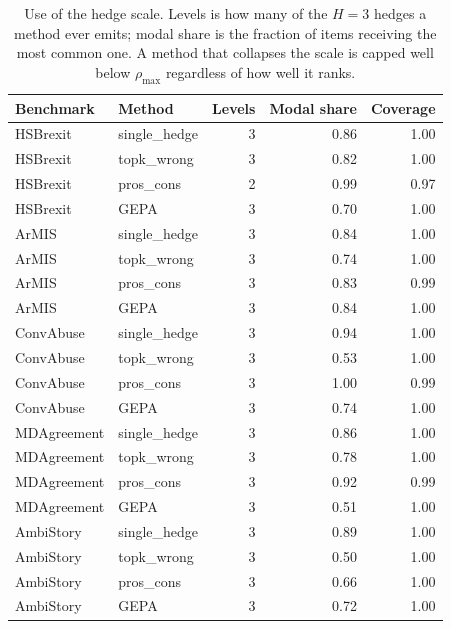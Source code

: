 \begin{table}[t]
\centering
\small
\begin{tabular}{llrrr}
\hline
Benchmark & Method & Levels & Modal share & Coverage \\
\hline
HSBrexit & single\_hedge & 3 & 0.86 & 1.00 \\
HSBrexit & topk\_wrong & 3 & 0.82 & 1.00 \\
HSBrexit & pros\_cons & 2 & 0.99 & 0.97 \\
HSBrexit & GEPA & 3 & 0.70 & 1.00 \\
ArMIS & single\_hedge & 3 & 0.84 & 1.00 \\
ArMIS & topk\_wrong & 3 & 0.74 & 1.00 \\
ArMIS & pros\_cons & 3 & 0.83 & 0.99 \\
ArMIS & GEPA & 3 & 0.84 & 1.00 \\
ConvAbuse & single\_hedge & 3 & 0.94 & 1.00 \\
ConvAbuse & topk\_wrong & 3 & 0.53 & 1.00 \\
ConvAbuse & pros\_cons & 3 & 1.00 & 0.99 \\
ConvAbuse & GEPA & 3 & 0.74 & 1.00 \\
MDAgreement & single\_hedge & 3 & 0.86 & 1.00 \\
MDAgreement & topk\_wrong & 3 & 0.78 & 1.00 \\
MDAgreement & pros\_cons & 3 & 0.92 & 0.99 \\
MDAgreement & GEPA & 3 & 0.51 & 1.00 \\
AmbiStory & single\_hedge & 3 & 0.89 & 1.00 \\
AmbiStory & topk\_wrong & 3 & 0.50 & 1.00 \\
AmbiStory & pros\_cons & 3 & 0.66 & 1.00 \\
AmbiStory & GEPA & 3 & 0.72 & 1.00 \\
\hline
\end{tabular}
\caption{Use of the hedge scale. Levels is how many of the $H=3$ hedges a method ever emits; modal share is the fraction of items receiving the most common one. A method that collapses the scale is capped well below $\rho_{\max}$ regardless of how well it ranks.}
\label{tab:stability}
\end{table}